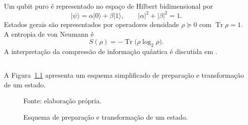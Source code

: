 \chapter{}
\label{cap:fundamentacao}
\section{}
Um qubit puro é representado no espaço de Hilbert bidimensional por
\begin{equation}\label{eq:qubit}
  \lvert\psi\rangle=\alpha\lvert0\rangle+\beta\lvert1\rangle,
  \qquad |\alpha|^{2}+|\beta|^{2}=1.
\end{equation}
Estados gerais são representados por operadores densidade $\rho\succeq0$ com $\operatorname{Tr}\rho=1$. A entropia de von Neumann é
\begin{equation}\label{eq:entropia}
  S(\rho)=-\operatorname{Tr}\bigl(\rho\log_{2}\rho\bigr).
\end{equation}
A interpretação da compressão de informação quântica é discutida em \textcite{schumacher1995}. 

\section{}
A Figura~\ref{fig:fluxo} apresenta um esquema simplificado de preparação e transformação de um estado.
\begin{figure}[htbp]
\centering
\caption{Esquema de preparação e transformação de um estado.}
\label{fig:fluxo}
\vspace{.35cm}
\par\medskip
\begin{minipage}{.55\textwidth}
\raggedright\footnotesize Fonte: elaboração própria.
\end{minipage}
\end{figure}
